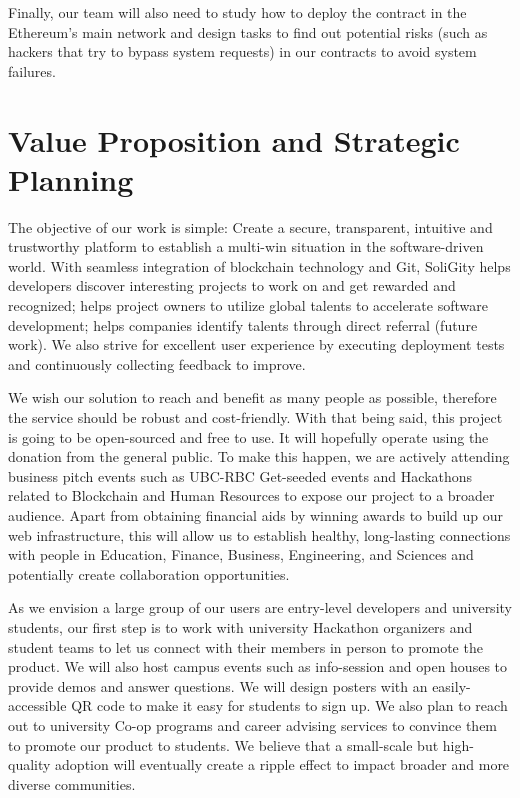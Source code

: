 \documentclass[12pt]{article}
\renewcommand{\_}{\kern-1.5pt\textunderscore\kern-1.5pt}
\begin{document}
Finally, our team will also need to study how to deploy the contract in the Ethereum’s main network and design tasks to find out potential risks (such as hackers that try to bypass system requests) in our contracts to avoid system failures.

\section{Value Proposition and Strategic Planning}
The objective of our work is simple: Create a secure, transparent, intuitive and trustworthy platform to establish a multi-win situation in the software-driven world. With seamless integration of blockchain technology and Git, SoliGity helps developers discover interesting projects to work on and get rewarded and recognized; helps project owners to utilize global talents to accelerate software development; helps companies identify talents through direct referral (future work). We also strive for excellent user experience by executing deployment tests and continuously collecting feedback to improve. 

We wish our solution to reach and benefit as many people as possible, therefore the service should be robust and cost-friendly. With that being said, this project is going to be open-sourced and free to use. It will hopefully operate using the donation from the general public. To make this happen, we are actively attending business pitch events such as UBC-RBC Get-seeded events and Hackathons related to Blockchain and Human Resources to expose our project to a broader audience. Apart from obtaining financial aids by winning awards to build up our web infrastructure, this will allow us to establish healthy, long-lasting connections with people in Education, Finance, Business, Engineering, and Sciences and potentially create collaboration opportunities.

As we envision a large group of our users are entry-level developers and university students, our first step is to work with university Hackathon organizers and student teams to let us connect with their members in person to promote the product. We will also host campus events such as info-session and open houses to provide demos and answer questions. We will design posters with an easily-accessible QR code to make it easy for students to sign up. We also plan to reach out to university Co-op programs and career advising services to convince them to promote our product to students. We believe that a small-scale but high-quality adoption will eventually create a ripple effect to impact broader and more diverse communities. 
\end{document}
